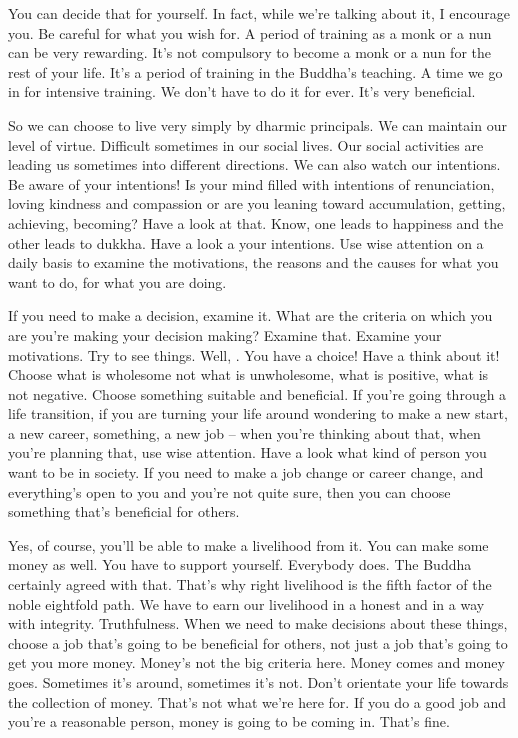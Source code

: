 \documentclass[letterpaper,10pt,english]{sphinxmanual}
\begin{document}
\sphinxAtStartPar
You can decide that for yourself. In fact, while we’re talking about it,
I encourage you. Be careful for what you wish for. A period of training as a
monk or a nun can be very rewarding. It’s not compulsory to become a monk
or a nun for the rest of your life. It’s a period of training in the Buddha’s
teaching. A time we go in for intensive training. We don’t have to do it for
  ever. It’s very beneficial.

\sphinxAtStartPar
So we can choose to live very simply by dharmic principals. We can
maintain  our  level  of  virtue.  Difficult  sometimes  in  our  social  lives.  Our
social activities are leading us sometimes into different directions. We can
also watch our intentions. Be aware of your intentions! Is your mind filled
with intentions of renunciation, loving kindness and compassion or are you
leaning  toward  accumulation,  getting,  achieving,  becoming?  Have  a  look
at that. Know, one leads to happiness and the other leads to dukkha. Have
a look a your intentions. Use wise attention on a daily basis to examine the
motivations, the reasons and the causes for what you want to do, for what
you are doing.

\sphinxAtStartPar
If  you  need  to  make  a  decision,  examine  it. What  are  the  criteria  on
which you are you’re making your decision making? Examine that. Examine your motivations. Try to see things. Well,
. You have a choice! Have a think about it! Choose what is wholesome
not  what  is  unwholesome,  what  is  positive,  what  is  not  negative.  Choose
something suitable and beneficial. If you’re going through a life transition,
if you are turning your life around wondering to make a new start, a new
career, something, a new job – when you’re thinking about that, when you’re
planning that, use wise attention. Have a look what kind of person you want
to  be  in  society.  If  you  need  to  make  a  job  change  or  career  change,  and
everything’s  open  to  you  and  you’re  not  quite  sure,  then  you  can  choose
something that’s beneficial for others.

\sphinxAtStartPar
Yes,  of  course,  you’ll  be  able  to  make  a  livelihood  from  it. You  can
make some money as well. You have to support yourself. Everybody does.
The Buddha certainly agreed with that. That’s why right livelihood is the fifth
factor of the noble eightfold path. We have to earn our livelihood in a honest
and in a way with integrity. Truthfulness. When we need to make decisions
about these things, choose a job that’s going to be beneficial for others, not
just a job that’s going to get you more money. Money’s not the big criteria
here. Money comes and money goes. Sometimes it’s around, sometimes it’s
not.  Don’t  orientate  your  life  towards  the  collection  of  money.  That’s  not
what we’re here for. If you do a good job and you’re a reasonable person,
  money is going to be coming in. That’s fine.
\end{document}
